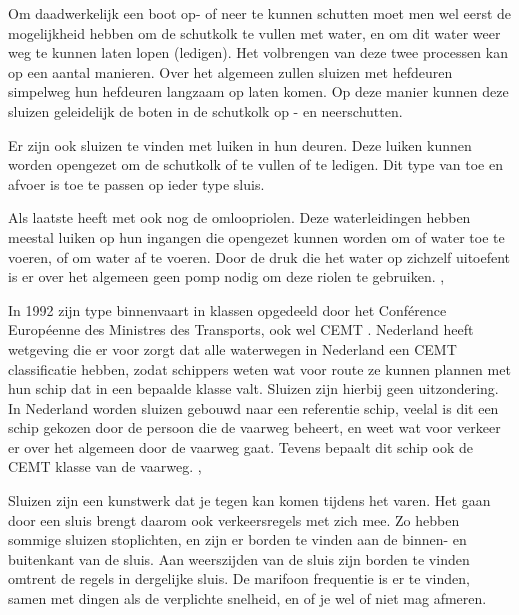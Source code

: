 \documentclass[../verslag.tex]{subfiles}
\begin{document}
Om daadwerkelijk een boot op- of neer te kunnen schutten moet men wel eerst de mogelijkheid hebben om de schutkolk te vullen met water, en om dit water weer weg te kunnen laten lopen (ledigen). Het volbrengen van deze twee processen kan op een aantal manieren. Over het algemeen zullen sluizen met hefdeuren simpelweg hun hefdeuren langzaam op laten komen. Op deze manier kunnen deze sluizen geleidelijk de boten in de schutkolk op - en neerschutten. \cite{bezuijen_2000}

Er zijn ook sluizen te vinden met luiken in hun deuren. Deze luiken kunnen worden opengezet om de schutkolk of te vullen of te ledigen. Dit type van toe en afvoer is toe te passen op ieder type sluis. \cite{bezuijen_2000}

Als laatste heeft met ook nog de omloopriolen. Deze waterleidingen hebben meestal luiken op hun ingangen die opengezet kunnen worden om of water toe te voeren, of om water af te voeren. Door de druk die het water op zichzelf uitoefent is er over het algemeen geen pomp nodig om deze riolen te gebruiken. \cite{gww_2020}, \cite{bezuijen_2000}

In 1992 zijn type binnenvaart in klassen opgedeeld door het Conférence Européenne des Ministres des Transports, ook wel CEMT \cite{cemt_1992}. Nederland heeft wetgeving die er voor zorgt dat alle waterwegen in Nederland een CEMT classificatie hebben, zodat schippers weten wat voor route ze kunnen plannen met hun schip dat in een bepaalde klasse valt. Sluizen zijn hierbij geen uitzondering. In Nederland worden sluizen gebouwd naar een referentie schip, veelal is dit een schip gekozen door de persoon die de vaarweg beheert, en weet wat voor verkeer er over het algemeen door de vaarweg gaat. Tevens bepaalt dit schip ook de CEMT klasse van de vaarweg. \cite{cemt_1992}, \cite{rws_2020}

Sluizen zijn een kunstwerk dat je tegen kan komen tijdens het varen. Het gaan door een sluis brengt daarom ook verkeersregels met zich mee. Zo hebben sommige sluizen stoplichten, en zijn er borden te vinden aan de binnen- en buitenkant van de sluis. Aan weerszijden van de sluis zijn borden te vinden omtrent de regels in dergelijke sluis. De marifoon frequentie is er te vinden, samen met dingen als de verplichte snelheid, en of je wel of niet mag afmeren. \cite{zeilen_2013}
\end{document}
